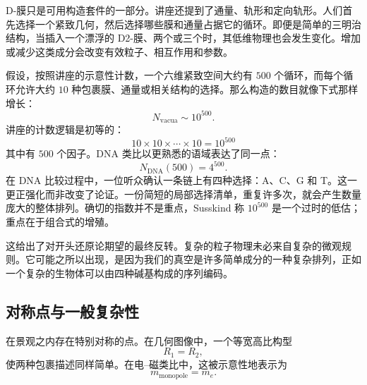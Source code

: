D-膜只是可用构造套件的一部分。讲座还提到了通量、轨形和定向轨形。人们首先选择一个紧致几何，然后选择哪些膜和通量占据它的循环。即便是简单的三明治结构，当插入一个漂浮的 D2-膜、两个或三个时，其低维物理也会发生变化。增加或减少这类成分会改变有效粒子、相互作用和参数。

假设，按照讲座的示意性计数，一个六维紧致空间大约有 \(500\) 个循环，而每个循环允许大约 \(10\) 种包裹膜、通量或相关结构的选择。那么构造的数目就像下式那样增长：
\begin{equation}
N_{\mathrm{vacua}} \sim 10^{500}.
\end{equation}
讲座的计数逻辑是初等的：
\begin{equation}
10 \times 10 \times \cdots \times 10 = 10^{500}
\end{equation}
其中有 \(500\) 个因子。DNA 类比以更熟悉的语域表达了同一点：
\begin{equation}
N_{\mathrm{DNA}}(500)=4^{500}.
\end{equation}
在 DNA 比较过程中，一位听众确认一条链上有四种选择：A、C、G 和 T。这一更正强化而非改变了论证。一份简短的局部选择清单，重复许多次，就会产生数量庞大的整体排列。确切的指数并不是重点，Susskind 称 \(10^{500}\) 是一个过时的低估；重点在于组合式的增殖。

这给出了对开头还原论期望的最终反转。复杂的粒子物理未必来自复杂的微观规则。它可能之所以出现，是因为我们的真空是许多简单成分的一种复杂排列，正如一个复杂的生物体可以由四种碱基构成的序列编码。

\begin{classroomqa}
\end{classroomqa}

\subsection{对称点与一般复杂性}

在景观之内存在特别对称的点。在几何图像中，一个等宽高比构型
\begin{equation}
R_1=R_2,
\end{equation}
使两种包裹描述同样简单。在电--磁类比中，这被示意性地表示为
\begin{equation}
m_{\mathrm{monopole}}=m_e.
\end{equation}

